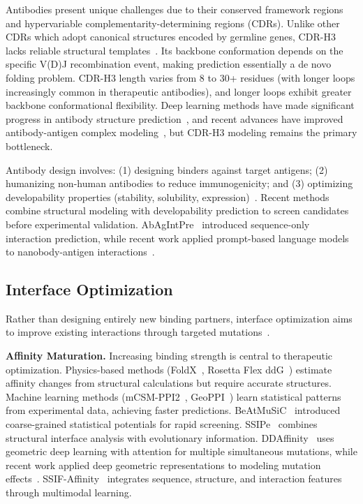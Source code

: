 Antibodies present unique challenges due to their conserved framework regions and hypervariable complementarity-determining regions (CDRs). Unlike other CDRs which adopt canonical structures encoded by germline genes, CDR-H3 lacks reliable structural templates~\cite{alford2017rosettaantibody}. Its backbone conformation depends on the specific V(D)J recombination event, making prediction essentially a de novo folding problem. CDR-H3 length varies from 8 to 30+ residues (with longer loops increasingly common in therapeutic antibodies), and longer loops exhibit greater backbone conformational flexibility. Deep learning methods have made significant progress in antibody structure prediction~\cite{ruffolo2022deepab,ruffolo2023igfold,henry2024abodybuilder3,abanades2023immunebuilder}, and recent advances have improved antibody-antigen complex modeling~\cite{kenlay2024antibody,huang2024antibody}, but CDR-H3 modeling remains the primary bottleneck.

Antibody design involves: (1) designing binders against target antigens; (2) humanizing non-human antibodies to reduce immunogenicity; and (3) optimizing developability properties (stability, solubility, expression)~\cite{raybould2019developability}. Recent methods combine structural modeling with developability prediction to screen candidates before experimental validation. AbAgIntPre~\cite{li2022abagintpre} introduced sequence-only interaction prediction, while recent work applied prompt-based language models to nanobody-antigen interactions~\cite{zhang2024nanobody}.

\subsection{Interface Optimization}

Rather than designing entirely new binding partners, interface optimization aims to improve existing interactions through targeted mutations~\cite{jankauskaite2019skempi2}.

\textbf{Affinity Maturation.} Increasing binding strength is central to therapeutic optimization. Physics-based methods (FoldX~\cite{guerois2005foldx}, Rosetta Flex ddG~\cite{barlow2018flexddg}) estimate affinity changes from structural calculations but require accurate structures. Machine learning methods (mCSM-PPI2~\cite{rodrigues2019mcsm}, GeoPPI~\cite{liu2021geoppi}) learn statistical patterns from experimental data, achieving faster predictions. BeAtMuSiC~\cite{dehouck2013beatmusic} introduced coarse-grained statistical potentials for rapid screening. SSIPe~\cite{li2022ssipe} combines structural interface analysis with evolutionary information. DDAffinity~\cite{luo2024ddaffinity} uses geometric deep learning with attention for multiple simultaneous mutations, while recent work applied deep geometric representations to modeling mutation effects~\cite{qiu2024ipe}. SSIF-Affinity~\cite{liu2024ssifaffinity} integrates sequence, structure, and interaction features through multimodal learning.

